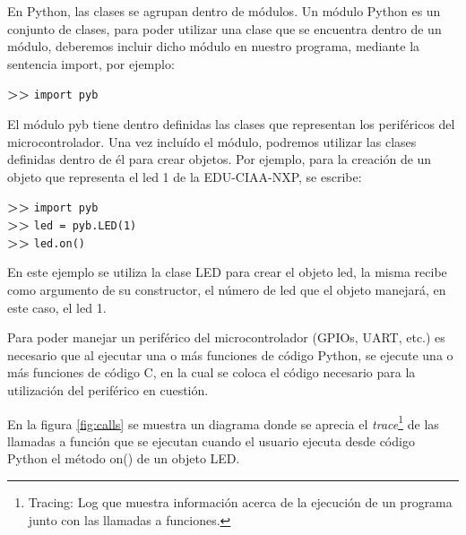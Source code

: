 En Python, las clases se agrupan dentro de módulos. Un módulo Python es un conjunto de clases, para poder utilizar una clase que se encuentra dentro de un módulo, deberemos incluir dicho módulo en nuestro programa, mediante la sentencia import, por ejemplo:

\textbf{{\fontsize{16}{16}\selectfont \textgreater\textgreater}} \texttt{import pyb}

El módulo pyb tiene dentro definidas las clases que representan los periféricos del microcontrolador. Una vez incluído el módulo, podremos utilizar las clases definidas dentro de él para crear objetos.
Por ejemplo, para la creación de un objeto que representa el led 1 de la EDU-CIAA-NXP, se escribe:

\textbf{{\fontsize{16}{16}\selectfont \textgreater\textgreater}} \texttt{import pyb}\\
\textbf{{\fontsize{16}{16}\selectfont \textgreater\textgreater}} \texttt{led = pyb.LED(1)}\\
\textbf{{\fontsize{16}{16}\selectfont \textgreater\textgreater}} \texttt{led.on()}

En este ejemplo se utiliza la clase LED para crear el objeto led, la misma recibe como argumento de su constructor, el número de led que el objeto manejará, en este caso, el led 1.

Para poder manejar un periférico del microcontrolador (GPIOs, UART, etc.) es necesario que al ejecutar una o más funciones de código Python, se ejecute una o más funciones de código C, en la cual se coloca el código necesario para la utilización del periférico en cuestión.

En la figura \ref{fig:calls} se muestra un diagrama donde se aprecia el \textit{trace}\footnote{Tracing: Log que muestra información acerca de la ejecución de un programa junto con las llamadas a funciones.} de las llamadas a función que se ejecutan cuando el usuario ejecuta desde código Python el método on() de un objeto LED.

